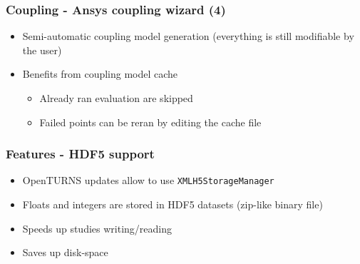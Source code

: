 \documentclass[aspectratio=169]{beamer}
\begin{document}

\begin{frame}
  \frametitle{Coupling - Ansys coupling wizard (4)}
  \begin{itemize}
  \item Semi-automatic coupling model generation (everything is still modifiable by the user)
  \item Benefits from coupling model cache
    \begin{itemize}
    \item Already ran evaluation are skipped
    \item Failed points can be reran by editing the cache file
    \end{itemize}
  \end{itemize}
\end{frame}


\begin{frame}
  \frametitle{Features - HDF5 support}
  \begin{itemize}
  \item OpenTURNS updates allow to use \texttt{XMLH5StorageManager}
  \item Floats and integers are stored in HDF5 datasets (zip-like binary file)
  \item Speeds up studies writing/reading
  \item Saves up disk-space
  \end{itemize}
\end{frame}

\end{document}
